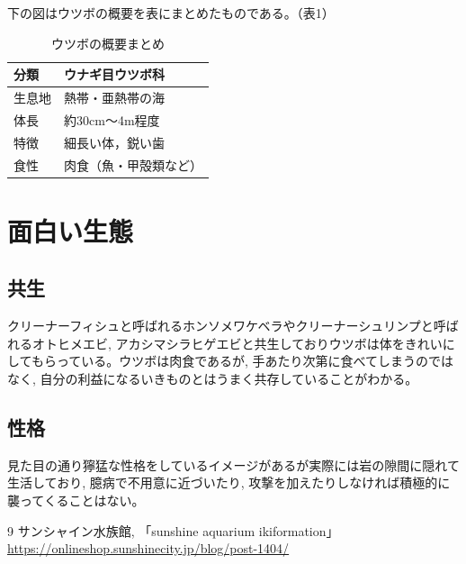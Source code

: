 \documentclass[dvipdfmx]{jsarticle}
\begin{document}
下の図はウツボの概要を表にまとめたものである。（表1）
\begin{table}[htbp]
\centering
\begin{tabular}{|l|l|}
\hline
分類 & ウナギ目ウツボ科 \\
\hline
生息地 & 熱帯・亜熱帯の海 \\
\hline
体長 & 約30cm〜4m程度 \\
\hline
特徴 & 細長い体，鋭い歯 \\
\hline
食性 & 肉食（魚・甲殻類など） \\
\hline
\end{tabular}
\caption{ウツボの概要まとめ}
\label{tab:basic}

\raggedright
\section{面白い生態}
\subsection{共生}
クリーナーフィシュと呼ばれるホンソメワケベラやクリーナーシュリンプと呼ばれるオトヒメエビ, アカシマシラヒゲエビと共生しておりウツボは体をきれいにしてもらっている。ウツボは肉食であるが, 手あたり次第に食べてしまうのではなく, 自分の利益になるいきものとはうまく共存していることがわかる。
\subsection{性格}
見た目の通り獰猛な性格をしているイメージがあるが実際には岩の隙間に隠れて生活しており, 臆病で不用意に近づいたり, 攻撃を加えたりしなければ積極的に襲ってくることはない。



\begin{thebibliography}{9}
サンシャイン水族館, 「sunshine aquarium ikiformation」\url{https://onlineshop.sunshinecity.jp/blog/post-1404/}
\end{thebibliography}
\end{table}
\end{document}
